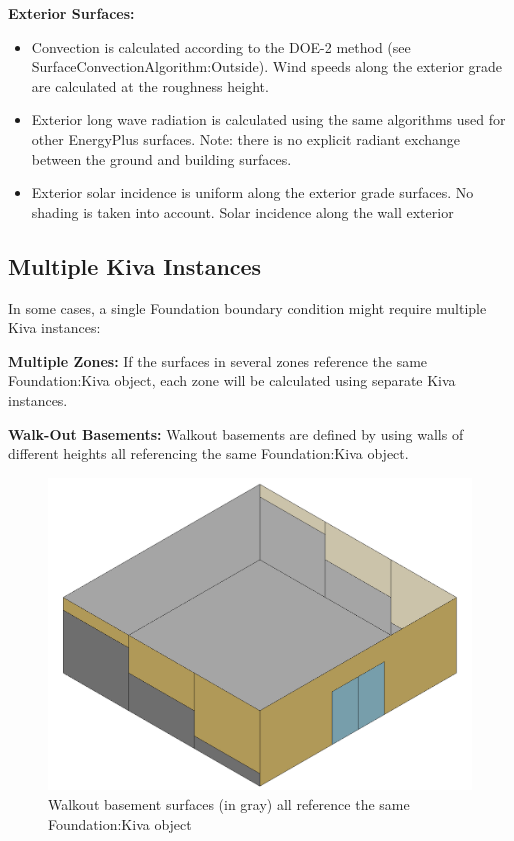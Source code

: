 \textbf{Exterior Surfaces:}

\begin{itemize}
\tightlist
\item
  Convection is calculated according to the DOE-2 method (see
  SurfaceConvectionAlgorithm:Outside). Wind speeds along the exterior
  grade are calculated at the roughness height.
\item
  Exterior long wave radiation is calculated using the same algorithms
  used for other EnergyPlus surfaces. Note: there is no explicit radiant
  exchange between the ground and building surfaces.
\item
  Exterior solar incidence is uniform along the exterior grade surfaces.
  No shading is taken into account. Solar incidence along the wall
  exterior
\end{itemize}

\subsection{Multiple Kiva Instances}\label{multiple-kiva-instances}

In some cases, a single Foundation boundary condition might require
multiple Kiva instances:

\textbf{Multiple Zones:} If the surfaces in several zones reference the
same Foundation:Kiva object, each zone will be calculated using separate
Kiva instances.

\textbf{Walk-Out Basements:} Walkout basements are defined by using
walls of different heights all referencing the same Foundation:Kiva
object.

\begin{figure}
\centering
\includegraphics{media/kiva-walkout-segs.png}
\caption{Walkout basement surfaces (in gray) all reference the same
Foundation:Kiva object\label{fig:wo-s2}}
\end{figure}


